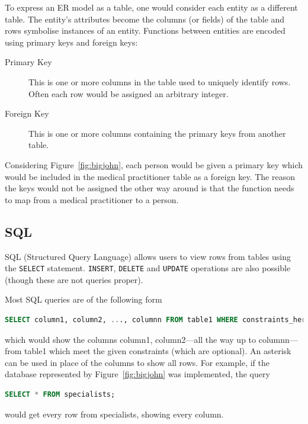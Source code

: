\documentclass[11pt,a4paper]{report}
\begin{document}
	To express an ER model as a table, one would consider each entity as a different table. The entity's attributes become the columns (or fields) of the table and rows symbolise instances of an entity. Functions between entities are encoded using primary keys and foreign keys:
	\begin{description}
		\item[Primary Key] This is one or more columns in the table used to uniquely identify rows. Often each row would be assigned an arbitrary integer.
		\item[Foreign Key] This is one or more columns containing the primary keys from another table.
	\end{description}
	Considering Figure~\ref{fig:bigjohn}, each {\sc person} would be given a primary key which would be included in the {\sc medical practitioner} table as a foreign key. The reason the keys would not be assigned the other way around is that the function needs to map from a {\sc medical practitioner} to a {\sc person}.
	\subsection{SQL} \label{sec:sql}
	SQL (Structured Query Language) allows users to view rows from tables using the \verb|SELECT| statement. \verb|INSERT|, \verb|DELETE| and \verb|UPDATE| operations are also possible (though these are not queries proper).
	
	Most SQL queries are of the following form
	\begin{lstlisting}[style=highlightable, frame=none, numbers=none, xleftmargin=0ex, xrightmargin=0ex, language=SQL]
SELECT column1, column2, ..., columnn FROM table1 WHERE constraints_here;
	\end{lstlisting}
	which would show the columns column1, column2---all the way up to columnn---from table1 which meet the given constraints (which are optional). An asterisk can be used in place of the columns to show all rows. For example, if the database represented by Figure~\ref{fig:bigjohn} was implemented, the query
	\begin{lstlisting}[style=highlightable, frame=none, numbers=none, xleftmargin=0ex, xrightmargin=0ex, language=SQL]
SELECT * FROM specialists;
	\end{lstlisting}
	would get every row from specialists, showing every column.
	
\end{document}
